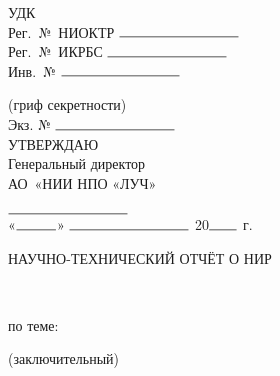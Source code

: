 
\thispagestyle{empty}
\loochHat

\vspace{1cm}

\noindent
\begin{minipage}{0.45\textwidth}
УДК\\
Рег.~№~НИОКТР \(\rule{3cm}{0.5pt}\)\\
Рег.~№~ИКРБС  \(\rule{3cm}{0.5pt}\)\\
Инв.~№ \(\rule{3cm}{0.5pt}\)
\end{minipage}\hfill
\begin{minipage}{0.45\textwidth}
(гриф секретности)\\
Экз. № \(\rule{3cm}{0.5pt}\)\\
УТВЕРЖДАЮ\\
Генеральный директор    \\   
АО~«НИИ НПО «ЛУЧ»\\
\loochDirTitle \\
\(\rule{3cm}{0.5pt}\) \loochDir \\
«\(\rule{1cm}{0.5pt}\)»   \(\rule{3cm}{0.5pt}\) 20\(\rule{0.7cm}{0.5pt}\) г.
\end{minipage}

\vspace{0.7cm}

\begin{center}
НАУЧНО-ТЕХНИЧЕСКИЙ ОТЧЁТ О НИР

\vspace{0.3cm}

\loochNTORepTitle\\
\loochNTORepCode

\vspace{0.3cm}

по теме:

\loochNTORepTheme
 
(заключительный)

\vspace{0.3cm}



\end{center}

\vspace{0.5cm}


